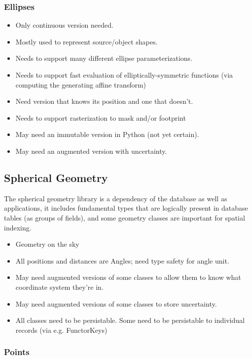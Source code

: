 \subsubsection{Ellipses}
\label{sec:spCartesianEllipses}

\begin{itemize}
\item Only continuous version needed.
\item Mostly used to represent source/object shapes.
\item Needs to support many different ellipse parameterizations.
\item Needs to support fast evaluation of elliptically-symmetric functions (via computing the generating affine transform)
\item Need version that knows its position and one that doesn't.
\item Needs to support rasterization to mask and/or footprint
\item May need an immutable version in Python (not yet certain).
\item May need an  augmented version with uncertainty.
\end{itemize}


\subsection{Spherical Geometry}
\label{sec:spSphericalGeometry}

The spherical geometry library is a dependency of the database as well as applications, it includes fundamental types that are logically present in database tables (as groups of fields), and some geometry classes are important for spatial indexing.

\begin{itemize}
\item Geometry on the sky
\item All positions and distances are Angles; need type safety for angle unit.
\item May need augmented versions of some classes to allow them to know what coordinate system they're in.
\item May need augmented versions of some classes to store uncertainty.
\item All classes need to be persistable.  Some need to be persistable to individual records (via e.g. FunctorKeys)
\end{itemize}

\subsubsection{Points}
\label{sec:spSphericalPoints}

